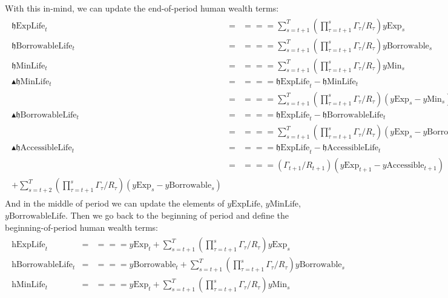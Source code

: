 \documentclass[titlepage,abstract]{\econtex}
\providecommand{\hExpLife}{\mathrm{h}\text{ExpLife}}
\providecommand{\hMinLife}{\mathrm{h}\text{MinLife}}
\providecommand{\hBorrowableLife}{\mathrm{h}\text{BorrowableLife}}
\providecommand{\hEndExpLife}{\mathfrak{h}\text{ExpLife}}
\providecommand{\hEndMinLife}{\mathfrak{h}\text{MinLife}}
\providecommand{\hEndBorrowableLife}{\mathfrak{h}\text{BorrowableLife}}
\providecommand{\hEndAccessibleLife}{\mathfrak{h}\text{AccessibleLife}}
\providecommand{\DeltahEndMinLife}{\blacktriangle \mathfrak{h}\text{MinLife}}
\providecommand{\DeltahEndBorrowableLife}{\blacktriangle \mathfrak{h}\text{BorrowableLife}}
\providecommand{\DeltahEndAccessibleLife}{\blacktriangle \mathfrak{h}\text{AccessibleLife}}
\providecommand{\yMinLife}{y\text{MinLife}}
\providecommand{\yBorrowableLife}{y\text{BorrowableLife}}
\providecommand{\yExpLife}{y\text{ExpLife}}
\providecommand{\yMin}{y\text{Min}}
\providecommand{\yBorrowable}{y\text{Borrowable}}
\providecommand{\yAccessible}{y\text{Accessible}}
\providecommand{\yExp}{y\text{Exp}}
\begin{document}
With this in-mind, we can update the end-of-period human wealth terms:
\begin{equation}\begin{gathered}\begin{aligned}
          \hEndExpLife_{t}    &=& =  =  =  \sum_{s=t+1}^{T} (\prod_{\tau=t+1}^{s}\Gamma_{\tau} /R_{\tau}) \yExp_{s} \\
          \hEndBorrowableLife_{t}    &=& =  =  =  \sum_{s=t+1}^{T} (\prod_{\tau=t+1}^{s}\Gamma_{\tau}/R_{\tau}) \yBorrowable_{s} \\
          \hEndMinLife_{t}    &=& =  =  =  \sum_{s=t+1}^{T} (\prod_{\tau=t+1}^{s}\Gamma_{\tau}/R_{\tau}) \yMin_{s} \\
          \DeltahEndMinLife_{t}    &=& =  =  =  \hEndExpLife_{t} -  \hEndMinLife_{t}\\
                             &=& =  =  =  \sum_{s=t+1}^{T} (\prod_{\tau=t+1}^{s}\Gamma_{\tau}/R_{\tau}) (\yExp_{s}-\yMin_{s}) \\
          \DeltahEndBorrowableLife_{t}    &=& =  =  =  \hEndExpLife_{t} -  \hEndBorrowableLife_{t}\\
                             &=& =  =  =  \sum_{s=t+1}^{T} (\prod_{\tau=t+1}^{s}\Gamma_{\tau}/R_{\tau}) (\yExp_{s}-\yBorrowable_{s}) \\
          \DeltahEndAccessibleLife_{t}    &=& =  =  =  \hEndExpLife_{t} -  \hEndAccessibleLife_{t}\\
                             &=& =  =  =  (\Gamma_{t+1}/R_{t+1}) (\yExp_{t+1}-\yAccessible_{t+1}) \\
                            +\sum_{s=t+2}^{T} (\prod_{\tau=t+1}^{s}\Gamma_{\tau}/R_{\tau}) (\yExp_{s}-\yBorrowable_{s})
\end{aligned}\end{gathered}\end{equation}
And in the middle of period we can update the elements of $\yExpLife$, $\yMinLife$, $\yBorrowableLife$. Then we go back to the beginning of period and define the beginning-of-period human wealth terms:
\begin{equation}\begin{gathered}\begin{aligned}
          \hExpLife_{t}    &=& =  =  =  \yExp_{t} + \sum_{s=t+1}^{T} (\prod_{\tau=t+1}^{s}\Gamma_{\tau} /R_{\tau}) \yExp_{s} \\
          \hBorrowableLife_{t}    &=& =  =  =  \yBorrowable_{t} + \sum_{s=t+1}^{T} (\prod_{\tau=t+1}^{s}\Gamma_{\tau}/R_{\tau}) \yBorrowable_{s} \\
          \hMinLife_{t}    &=& =  =  =  \yExp_{t} +\sum_{s=t+1}^{T} (\prod_{\tau=t+1}^{s}\Gamma_{\tau}/R_{\tau}) \yMin_{s}
\end{aligned}\end{gathered}\end{equation}
\end{document}
